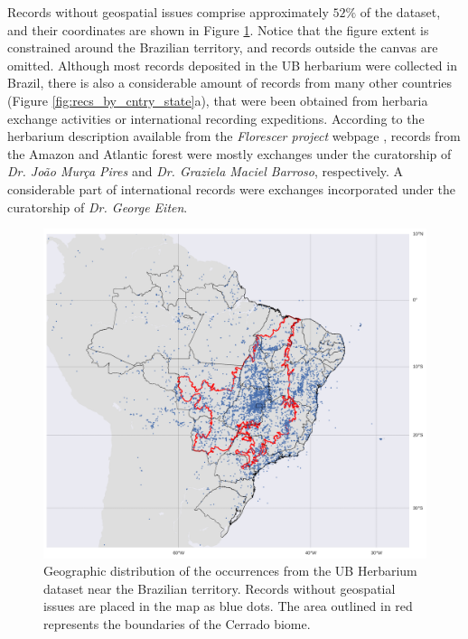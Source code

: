 Records without geospatial issues comprise approximately $52\%$ of the dataset, and their coordinates are shown in Figure \ref{fig:occurrence_map}. Notice that the figure extent is constrained around the Brazilian territory, and records outside the canvas are omitted. Although most records deposited in the UB herbarium were collected in Brazil, there is also a considerable amount of records from many other countries (Figure \ref{fig:recs_by_cntry_state}a), that were been obtained from herbaria exchange activities or international recording expeditions. According to the herbarium description available from the \textit{Florescer project} webpage , records from the Amazon and Atlantic forest were mostly exchanges under the curatorship of \textit{Dr. João Murça Pires} and \textit{Dr. Graziela Maciel Barroso}, respectively. A considerable part of international records were exchanges incorporated under the curatorship of \textit{Dr. George Eiten}.  


  \begin{figure}[!htb]
  	\centering
    \includegraphics[width=\linewidth]{figures/occurrence_map.png}
    \caption{Geographic distribution of the occurrences from the UB Herbarium dataset near the Brazilian territory. Records without geospatial issues are placed in the map as blue dots. The area outlined in red represents the boundaries of the Cerrado biome.}
    \label{fig:occurrence_map}
  \end{figure}
  
